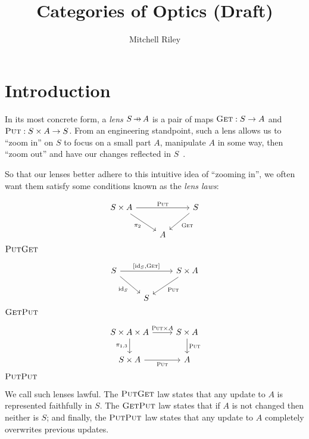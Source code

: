 \documentclass[11pt,letterpaper]{article}
\title{Categories of Optics (Draft)}
\author{Mitchell Riley}
\affil{Wesleyan University \\ \texttt{mvriley@wesleyan.edu}}
\theoremstyle{plain}
\theoremstyle{definition}
\newcommand{\id}{\mathrm{id}}
\newcommand{\fget}{\textsc{Get}}
\newcommand{\fput}{\textsc{Put}}
\newcommand{\hto}{\ensuremath{\,\mathaccent\shortmid\rightarrow\,}}
\begin{document}
\maketitle

\setcounter{tocdepth}{1}
\setlength\cftparskip{-8pt}
\tableofcontents
{}

\section{Introduction}

In its most concrete form, a \emph{lens} $S \hto A$ is a pair of maps ${\fget : S \to A}$ and ${\fput : S \times A \to S}$. From an engineering standpoint, such a lens allows us to ``zoom in'' on $S$ to focus on a small part $A$, manipulate $A$ in some way, then ``zoom out'' and have our changes reflected in $S$~\cite{CombinatorsForBidirectionalTreeTransformations}.

So that our lenses better adhere to this intuitive idea of ``zooming in'', we often want them satisfy some conditions known as the \emph{lens laws}:
\begin{center}
\begin{minipage}[b]{0.33333\textwidth}
\begin{center}
\[
\begin{tikzcd}
S \times A \ar[rr, "\fput"] \ar[dr, "\pi_2", swap] && S \ar[dl, "\fget"] \\
& A
\end{tikzcd}
\]
\hspace{0.8cm}$\fput\fget$
\end{center}
\end{minipage}%
\begin{minipage}[b]{0.33333\textwidth}
\begin{center}
\[
\begin{tikzcd}
S \ar[rr, "{[\id_S, \fget]}"] \ar[dr, "\id_S", swap] && S \times A \ar[dl, "\fput"] \\
& S
\end{tikzcd}
\]
\hspace{-0.6cm}$\fget\fput$
\end{center}
\end{minipage}%
\begin{minipage}[b]{0.33333\textwidth}
\begin{center}
\[
\begin{tikzcd}
S \times A \times A \ar[r, "\fput \times A"] \ar[d, "\pi_{1, 3}", swap] & S \times A\ar[d, "\fput"] \\
S \times A \ar[r, "\fput", swap] & A
\end{tikzcd}
\]
\quad$\fput\fput$
\end{center}
\end{minipage}%
\end{center}
We call such lenses lawful. The $\fput\fget$ law states that any update to $A$ is represented faithfully in $S$. The $\fget\fput$ law states that if $A$ is not changed then neither is $S$; and finally, the $\fput\fput$ law states that any update to $A$ completely overwrites previous updates.
\end{document}

